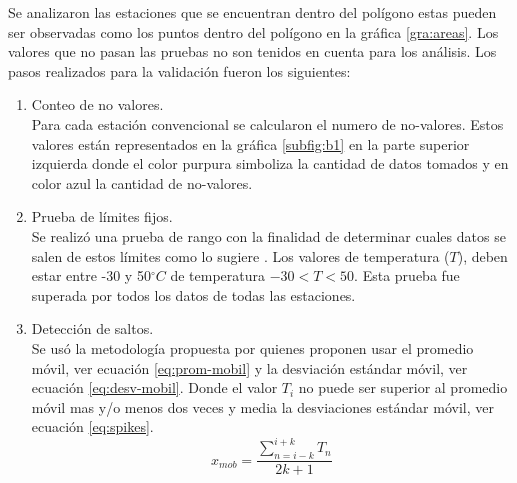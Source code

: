 \documentclass[11pt]{article}
\def\celc{$^{\circ}C$ }%
\begin{document}
Se analizaron las estaciones que se encuentran dentro del polígono estas pueden ser observadas como los puntos dentro del polígono en la gráfica \ref{gra:areas}. Los valores que no pasan las pruebas no son tenidos en cuenta para los análisis. Los pasos realizados para la validación fueron los siguientes:\\

\begin{enumerate}


	\item Conteo de no valores.\\
	Para cada estación convencional se calcularon el numero de no-valores. Estos valores están representados en la gráfica \ref{subfig:b1} en la parte superior izquierda donde el color purpura simboliza la cantidad de datos tomados y en color azul la cantidad de no-valores.

	\item Prueba de límites fijos.\\
	Se realizó una prueba de rango con la finalidad de determinar cuales datos se salen de estos límites como lo sugiere \citet{estevez2011}. Los valores de temperatura ($T$), deben estar entre -30 y 50\celc de temperatura $-30 < T< 50$. Esta prueba fue superada por todos los datos de todas las estaciones.


	\item Detección de saltos.\\
	Se usó la metodología propuesta por \citet{vickers1997} quienes proponen usar el promedio móvil, ver ecuación \ref{eq:prom-mobil} y la desviación estándar móvil, ver ecuación \ref{eq:desv-mobil}. Donde el valor $T_i$ no puede ser superior al promedio móvil mas y/o menos dos veces y media la desviaciones estándar móvil, ver ecuación \ref{eq:spikes}.\\
	
\begin{equation}\label{eq:prom-mobil}
    x_{mob} = \frac{\sum\limits_{n=i-k}^{i+k} T_{n}}{2k + 1}
\end{equation}


\end{enumerate}
\end{document}
